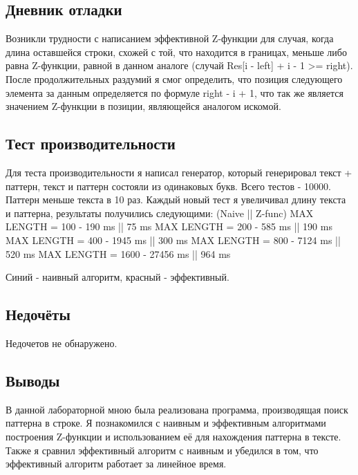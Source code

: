 \documentclass[12pt]{article}
\begin{document}
\subsection*{Дневник отладки}

Возникли трудности с написанием эффективной Z-функции для случая, когда длина оставшейся строки, схожей с той, что находится в границах, меньше либо равна Z-функции,
равной в данном аналоге (случай Res[i - left] + i - 1 >= right). После продолжительных раздумий я смог определить, что позиция следующего элемента за данным определяется по формуле right - i + 1,
что так же является значением Z-функции в позиции, являющейся аналогом искомой.


\subsection*{Тест производительности}

Для теста производительности я написал генератор, который генерировал текст + паттерн, текст и паттерн состояли из одинаковых букв. Всего тестов - 10000.
Паттерн меньше текста в 10 раз. Каждый новый тест я увеличивал длину текста и паттерна, результаты получились следующими:
\newline (Naive || Z-func)
\newline MAX LENGTH = 100 - 190 ms || 75 ms
\newline MAX LENGTH = 200 - 585 ms || 190 ms
\newline MAX LENGTH = 400 - 1945 ms || 300 ms
\newline MAX LENGTH = 800 - 7124 ms || 520 ms
\newline MAX LENGTH = 1600 - 27456 ms || 964 ms



Синий - наивный алгоритм, красный - эффективный.


\subsection*{Недочёты}

Недочетов не обнаружено.

\subsection*{Выводы}

В данной лабораторной мною была реализована программа, производящая поиск паттерна в строке. Я познакомился с наивным и эффективным алгоритмами построения Z-функции и использованием
её для нахождения паттерна в тексте. Также я сравнил эффективный алгоритм с наивным и убедился в том, что эффективный алгоритм работает за линейное время.
\end{document}
